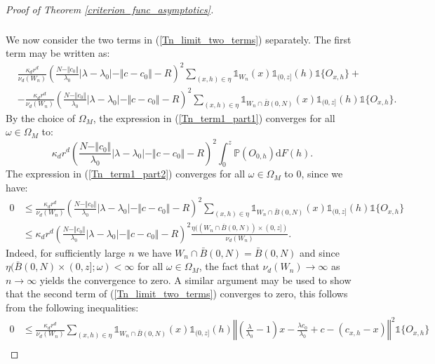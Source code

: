 \documentclass{article}
\newcommand{\PP}{\mathbb{P}}
\theoremstyle{plain}
\theoremstyle{remark}
\theoremstyle{definition}
\begin{document}
\begin{proof}[Proof of Theorem \ref{criterion_func_asymptotics}]
{\begin{align}
\begin{split}
        \end{split}
    \end{align}
    }
    We now consider the two terms in (\ref{Tn_limit_two_terms}) separately. The first term may be written as:
    {\allowdisplaybreaks
    \begin{align}
        &\frac{\kappa_d r^d}{\nu_d(W_n)}\left(\frac{N - \Vert c_0 \Vert}{\lambda_0}\left|\lambda-\lambda_0 \right| - \Vert c - c_0 \Vert - R \right)^2\sum_{(x,h) \in \eta} \mathds{1}_{W_n}(x)\mathds{1}_{(0,z]}(h)\mathds{1}\{O_{x,h}\} + \label{Tn_term1_part1} \\
        &- \frac{\kappa_d r^d}{\nu_d(W_n)}\left(\frac{N - \Vert c_0 \Vert}{\lambda_0}\left|\lambda-\lambda_0 \right| - \Vert c - c_0 \Vert - R \right)^2\sum_{(x,h) \in \eta} \mathds{1}_{W_n\cap \bar{B}(0,N)}(x)\mathds{1}_{(0,z]}(h) \mathds{1}\{O_{x,h}\}\label{Tn_term1_part2}.
    \end{align}
    }%
    By the choice of $\Omega_M$, the expression in (\ref{Tn_term1_part1}) converges for all $\omega \in \Omega_M$ to:
    \[\kappa_d r^d\left(\frac{N - \Vert c_0 \Vert}{\lambda_0}\left|\lambda-\lambda_0 \right| - \Vert c - c_0 \Vert - R \right)^2 \int_0^z \PP(O_{0,h})\mathrm{d}F(h).\]
    The expression in (\ref{Tn_term1_part2}) converges for all $\omega \in \Omega_M$ to $0$, since we have:
    \begin{align*}
        0 &\leq \frac{\kappa_d r^d}{\nu_d(W_n)}\left(\frac{N - \Vert c_0 \Vert}{\lambda_0}\left|\lambda-\lambda_0 \right| - \Vert c - c_0 \Vert - R \right)^2 \sum_{(x,h) \in \eta} \mathds{1}_{W_n \cap \bar{B}(0,N)}(x)\mathds{1}_{(0,z]}(h) \mathds{1}\{O_{x,h}\} \\
        &\leq \kappa_d r^d \left(\frac{N - \Vert c_0 \Vert}{\lambda_0}\left|\lambda-\lambda_0 \right| - \Vert c - c_0 \Vert - R \right)^2 \frac{\eta((W_n \cap \bar{B}(0,N))\times(0,z])}{\nu_d(W_n)}.
    \end{align*}
    Indeed, for sufficiently large $n$ we have $W_n \cap \bar{B}(0,N) = \bar{B}(0,N)$ and since $\eta(\bar{B}(0,N) \times (0,z];\omega) < \infty$ for all $\omega \in \Omega_M$, the fact that $\nu_d(W_n) \to \infty$ as $n \to \infty$ yields the convergence to zero. A similar argument may be used to show that the second term of (\ref{Tn_limit_two_terms}) converges to zero, this follows from the following inequalities:
    \begin{align*}
        0 &\leq \frac{\kappa_d r^d}{\nu_d(W_n)}\sum_{(x,h) \in \eta}\mathds{1}_{W_n \cap \bar{B}(0,N)}(x)\mathds{1}_{(0,z]}(h)\left\Vert \left(\frac{\lambda}{\lambda_0}-1\right)x -\frac{\lambda c_0}{\lambda_0} + c - (c_{x,h}-x) \right\Vert^2 \mathds{1}\{O_{x,h}\} \\

\end{align*}
\end{proof}
\end{document}
